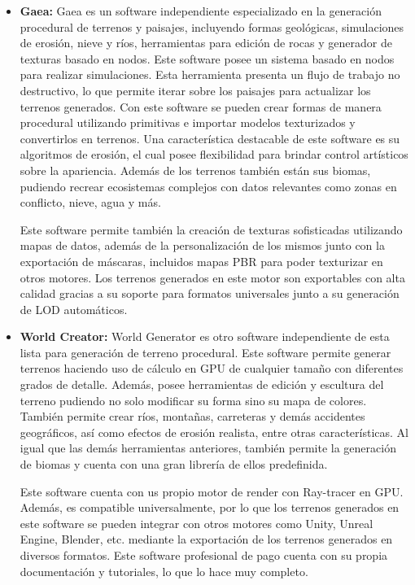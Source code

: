 \begin{itemize}[label=\textbullet]
                \item \textbf{Gaea: }
                Gaea es un software independiente especializado en la generación procedural de terrenos y paisajes, incluyendo formas geológicas, simulaciones de erosión, nieve y ríos, herramientas para edición de rocas y generador de texturas basado en nodos. Este software posee un sistema basado en nodos para realizar simulaciones. Esta herramienta presenta un flujo de trabajo no destructivo, lo que permite iterar sobre los paisajes para actualizar los terrenos generados. Con este software se pueden crear formas de manera procedural utilizando primitivas e importar modelos texturizados y convertirlos en terrenos. Una característica destacable de este software es su algoritmos de erosión, el cual posee flexibilidad para brindar control artísticos sobre la apariencia. Además de los terrenos también están sus biomas, pudiendo recrear ecosistemas complejos con datos relevantes como zonas en conflicto, nieve, agua y más. 

                Este software permite también la creación de texturas sofisticadas utilizando mapas de datos, además de la personalización de los mismos junto con la exportación de máscaras, incluidos mapas PBR para poder texturizar en otros motores. Los terrenos generados en este motor son exportables con alta calidad gracias a su soporte para formatos universales junto a su generación de LOD automáticos. \cite{QuadSpinner}

                \item \textbf{World Creator:}
                World Generator es otro software independiente de esta lista para generación de terreno procedural. Este software permite generar terrenos haciendo uso de cálculo en GPU de cualquier tamaño con  diferentes grados de detalle. Además, posee herramientas de edición y escultura del terreno pudiendo no solo modificar su forma sino su mapa de colores. También permite crear ríos, montañas, carreteras y demás accidentes geográficos, así como efectos de erosión realista, entre otras características. Al igual que las demás herramientas anteriores, también permite la generación de biomas y cuenta con una gran librería de ellos predefinida. 
                
                Este software cuenta con us propio motor de render con Ray-tracer en GPU. Además, es compatible universalmente, por lo que los terrenos generados en este software se pueden integrar con otros motores como Unity, Unreal Engine, Blender, etc. mediante la exportación de los terrenos generados en diversos formatos. Este software profesional de pago cuenta con su propia documentación y tutoriales, lo que lo hace muy completo. \cite{world-creator-website}
                

\end{itemize}
